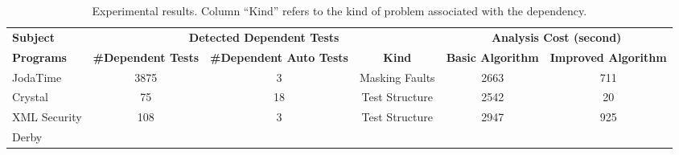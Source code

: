 \newcommand{\masking}{Masking Faults}
\newcommand{\initializaiton}{Test Structure} %
\newcommand{\spurious}{Spurious Bug}

\begin{table*}
\centering
\setlength{\tabcolsep}{0.3\tabcolsep}
\begin{tabular}{|l||c|c|c||c|c|}
\hline
\textbf{Subject} & \multicolumn{3}{|c||}{\textbf{Detected Dependent Tests}} & \multicolumn{2}{|c|}{\textbf{Analysis Cost (second)}}\\
\cline{2-6}
\textbf{Programs} & \textbf{\#Dependent Tests} & \textbf{\#Dependent Auto Tests} &
\textbf{Kind} &
\textbf{Basic Algorithm} & \textbf{Improved Algorithm}
\\
\hline
JodaTime & 3875 
& 3 & \masking{} & 2663 & 711  \\
Crystal & 75 & 18 &\initializaiton{} & 2542 & 20 \\
XML Security & 108 & 3 & \initializaiton{}& 2947 & 925  \\ %
Derby & &  & & & \\ 
\hline
\end{tabular}
\caption{Experimental results. Column ``Kind'' refers to the kind
of problem associated with the dependency. 
}
\label{tab:results}
\end{table*}

